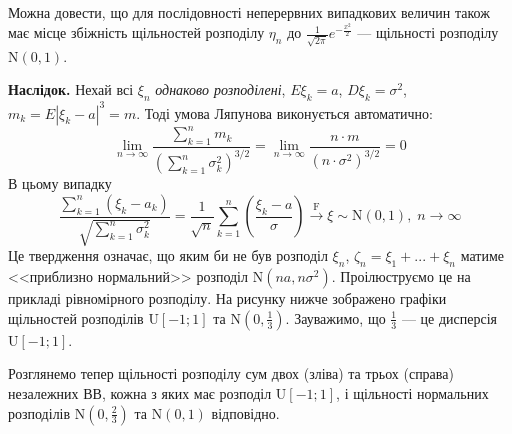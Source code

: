 \begin{remark}
    Можна довести, що для послідовності неперервних випадкових величин також має місце збіжність щільностей розподілу $\eta_n$ до $\frac{1}{\sqrt{2\pi}} e^{-\frac{x^2}{2}}$
    --- щільності розподілу $\mathrm{N}(0, 1)$.
\end{remark}
\noindent\textbf{Наслідок.} Нехай всі $\xi_n$ \emph{однаково розподілені}, $E\xi_k = a$, $D\xi_k = \sigma^2$,
$m_k = E\left| \xi_k - a\right|^3 = m$. Тоді умова Ляпунова виконується автоматично:
$$\underset{n \rightarrow \infty}{\lim} \frac{\sum\limits_{k=1}^n m_k}{\left(
    \sum\limits_{k=1}^n \sigma_k^2
\right)^{3/2}} = \underset{n \rightarrow \infty}{\lim} \frac{n \cdot m}{(n\cdot \sigma^2)^{3/2}} = 0$$
В цьому випадку
$$\frac{\sum\limits_{k=1}^n (\xi_k - a_k)}
{\sqrt{\sum\limits_{k=1}^n \sigma_k^2}}
= \frac{1}{\sqrt{n}} \sum\limits_{k=1}^n \left( \frac{\xi_k - a}{\sigma}\right) \overset{\mathrm{F}}{\longrightarrow}\xi \sim \mathrm{N}(0, 1),
\;n \to \infty$$
Це твердження означає, що яким би не був розподіл $\xi_n$, $\zeta_n  = \xi_1 + ... + \xi_n$ матиме <<приблизно нормальний>> розподіл $\mathrm{N}(n a, n\sigma^2)$.
Проілюструємо це на прикладі рівномірного розподілу. На рисунку нижче зображено графіки щільностей розподілів
$\mathrm{U}[-1; 1]$ та $\mathrm{N}\left(0, \frac{1}{3}\right)$. Зауважимо, що $\frac{1}{3}$ --- це дисперсія $\mathrm{U}[-1; 1]$.
\begin{center}
\end{center}
Розглянемо тепер щільності розподілу сум двох (зліва) та трьох (справа) незалежних ВВ, кожна з яких має розподіл $\mathrm{U}[-1; 1]$, і щільності
нормальних розподілів $\mathrm{N}\left(0, \frac{2}{3}\right)$ та $\mathrm{N}\left(0, 1\right)$ відповідно.

